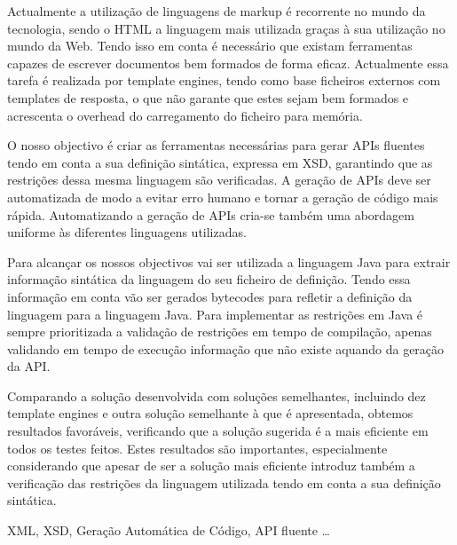 \abstractPT  %

Actualmente a utilização de linguagens de markup é recorrente no mundo da tecnologia, sendo o \ac{HTML} a linguagem mais utilizada graças à sua utilização no mundo da Web. Tendo isso em conta é necessário que existam ferramentas capazes de escrever documentos bem formados de forma eficaz. Actualmente essa tarefa é realizada por template engines, tendo como base ficheiros externos com templates de resposta, o que não garante que estes sejam bem formados e acrescenta o overhead do carregamento do ficheiro para memória.

\noindent
O nosso objectivo é criar as ferramentas necessárias para gerar \ac{API}s fluentes tendo em conta a sua definição sintática, expressa em \ac{XSD}, garantindo que as restrições dessa mesma linguagem são verificadas. A geração de \ac{API}s deve ser automatizada de modo a evitar erro humano e tornar a geração de código mais rápida. Automatizando a geração de \ac{API}s cria-se também uma abordagem uniforme às diferentes linguagens utilizadas.

\noindent
Para alcançar os nossos objectivos vai ser utilizada a linguagem Java para extrair informação sintática da linguagem do seu ficheiro de definição. Tendo essa informação em conta vão ser gerados bytecodes para refletir a definição da linguagem para a linguagem Java. Para implementar as restrições em Java é sempre prioritizada a validação de restrições em tempo de compilação, apenas validando em tempo de execução informação que não existe aquando da geração da \ac{API}.

\noindent
Comparando a solução desenvolvida com soluções semelhantes, incluindo dez template engines e outra solução semelhante à que é apresentada, obtemos resultados favoráveis, verificando que a solução sugerida é a mais eficiente em todos os testes feitos. Estes resultados são importantes, especialmente considerando que apesar de ser a solução mais eficiente introduz também a verificação das restrições da linguagem utilizada tendo em conta a sua definição sintática.

\begin{keywords}
XML, XSD, Geração Automática de Código, API fluente \ldots
\end{keywords}
